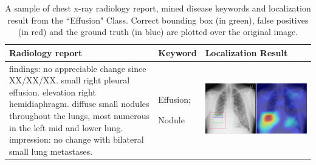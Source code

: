 \documentclass[10pt,twocolumn,letterpaper]{article}
\begin{document}
\begin{table}
	\begin{center}
		\begin{tabular}{p{15em}|p{6em}|p{23em}}
			\hline
			Radiology report & Keyword & Localization Result\\
			\hline\hline
			findings: no appreciable change since XX/XX/XX. small right pleural effusion. elevation right hemidiaphragm. diffuse small nodules throughout the lungs, most numerous in the left mid and lower lung. impression: no change with bilateral small lung metastases. 
			& Effusion;
			
			Nodule
			&\vspace{0cm}\includegraphics[width=1\linewidth]{00077747_01_c_3.png} \\
			\hline
		\end{tabular}
	\end{center}
	\caption{A sample of chest x-ray radiology report, mined disease keywords and localization result from the ``Effusion" Class. Correct bounding box (in green), false positives (in red) and the ground truth (in blue) are plotted over the original image.}
	\label{tab:Loc_example_3}
\end{table}
\end{document}
